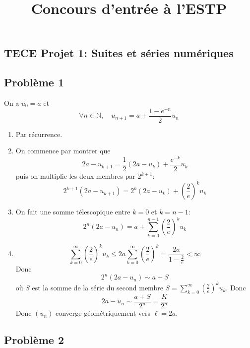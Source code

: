 \documentclass{article}
\title{Concours d'entrée à l'ESTP}
\date{}
\begin{document}
  \lstset{
    frame       = single,
    numbers     = left,
    showspaces  = false,
    showstringspaces    = false,
    captionpos  = t,
    caption     = \lstname
}
\begin{center}
\section*{TECE Projet 1: Suites et séries numériques}
\end{center}
\subsection*{Problème 1}
On a $u_0=a$ et
\[\forall n\in \mathbb{N},\quad u_{n+1}=a+\frac{1-e^{-n}}{2}u_n\]
\begin{enumerate}
\item Par récurrence.
\item On commence par montrer que
 \[2a-u_{k+1}=\frac 12 (2a-u_k)+\frac{e^{-k}}2 u_k\]
 puis on multiplie les deux membres par $2^{k+1}$:
\[2^{k+1}(2a-u_{k+1})=2^k(2a-u_k)+\left(\frac{2}{e}\right)^ku_k\]
\item On fait une somme télescopique entre $k=0$ et $k=n-1$:
\[2^n(2a-u_n)=a+\sum_{k=0}^{n-1}\left(\frac{2}{e}\right)^ku_k\]
\item  \[\sum_{k=0}^\infty\left(\frac{2}{e}\right)^ku_k\leq 2a \sum_{k=0}^\infty\left(\frac{2}{e}\right)^k =\frac{2a}{1-\frac 2e}<\infty\] 
Donc \[2^n(2a-u_n)\sim a+S\] où $S$ est la somme de la série du second membre $S=\sum_{k=0}^\infty\left(\frac{2}{e}\right)^ku_k$.
 Donc \[2a-u_n\sim\frac{a+S}{2^n}= \frac{K}{2^n}\] 
 Donc $(u_n)$ converge géométriquement vers $\ell=2a$.
\end{enumerate}

\subsection*{Problème 2}
\end{document}
